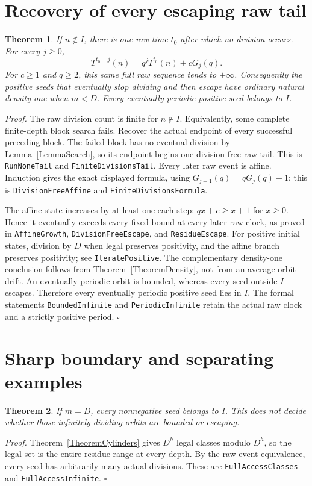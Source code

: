 \documentclass[11pt,letterpaper]{article}
\newtheorem{theorem}{Theorem}
\newenvironment{proof}{\noindent\textit{Proof.}}{\hfill\(\square\)}
\begin{document}
\section{Recovery of every escaping raw tail}

\begin{theorem}\label{TheoremTail}
If \(n\notin I\), there is one raw time \(t_0\) after which no division occurs.
For every \(j\ge0\),
\[
T^{t_0+j}(n)=q^jT^{t_0}(n)+cG_j(q).
\]
For \(c\ge1\) and \(q\ge2\), this same full raw sequence tends to \(+\infty\).
Consequently the positive seeds that eventually stop dividing and then escape
have ordinary natural density one when \(m<D\).
Every eventually periodic positive seed belongs to \(I\).
\end{theorem}
\begin{proof}
The raw division count is finite for \(n\notin I\).
Equivalently, some complete finite-depth block search fails.
Recover the actual endpoint of every successful preceding block.
The failed block has no eventual division by Lemma~\ref{LemmaSearch},
so its endpoint begins one division-free raw tail.
This is \texttt{RunNoneTail} and \texttt{FiniteDivisionsTail}.
Every later raw event is affine. Induction gives the exact displayed formula,
using \(G_{j+1}(q)=qG_j(q)+1\); this is
\texttt{DivisionFreeAffine} and \texttt{FiniteDivisionsFormula}.

The affine state increases by at least one each step:
\(qx+c\ge x+1\) for \(x\ge0\).
Hence it eventually exceeds every fixed bound at every later raw clock,
as proved in \texttt{AffineGrowth}, \texttt{DivisionFreeEscape}, and
\texttt{ResidueEscape}.
For positive initial states, division by \(D\) when legal preserves positivity,
and the affine branch preserves positivity; see \texttt{IteratePositive}.
The complementary density-one conclusion follows from
Theorem~\ref{TheoremDensity}, not from an average orbit drift.
An eventually periodic orbit is bounded, whereas every seed outside \(I\) escapes.
Therefore every eventually periodic positive seed lies in \(I\).
The formal statements \texttt{BoundedInfinite} and \texttt{PeriodicInfinite}
retain the actual raw clock and a strictly positive period.
\end{proof}

\section{Sharp boundary and separating examples}

\begin{theorem}\label{TheoremBoundary}
If \(m=D\), every nonnegative seed belongs to \(I\).
This does not decide whether those infinitely-dividing orbits are bounded or escaping.
\end{theorem}
\begin{proof}
Theorem~\ref{TheoremCylinders} gives \(D^h\) legal classes modulo \(D^h\),
so the legal set is the entire residue range at every depth.
By the raw-event equivalence, every seed has arbitrarily many actual divisions.
These are \texttt{FullAccessClasses} and \texttt{FullAccessInfinite}.
\end{proof}
\end{document}
